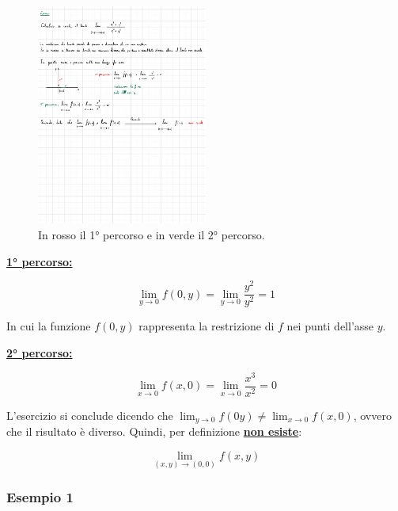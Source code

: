 \documentclass[a4paper]{article}
\begin{document}
	\begin{figure}[!htp]
		\centering
		\includegraphics[width=0.5\textwidth]{img/limiti.pdf}
		\caption{In rosso il 1° percorso e in verde il 2° percorso.}
	\end{figure}
	
	\noindent
	\textcolor{Red3}{\textbf{\underline{1° percorso:}}}
	
	\begin{equation*}
		\lim_{y \rightarrow 0} f\left(0,y\right) = \lim_{y \rightarrow 0} \dfrac{y^{2}}{y^{2}} = 1
	\end{equation*}

	\noindent
	In cui la funzione $f\left(0,y\right)$ rappresenta la restrizione di $f$ nei punti dell'asse $y$.\newline
	
	\noindent
	\textcolor{Green4}{\textbf{\underline{2° percorso:}}}
	
	\begin{equation*}
		\lim_{x \rightarrow 0} f\left(x,0\right) = \lim_{x \rightarrow 0} \dfrac{x^{3}}{x^{2}} = 0
	\end{equation*}
	
	\noindent
	L'esercizio si conclude dicendo che $\lim_{y \rightarrow 0}f\left(0y\right) \ne \lim_{x \rightarrow 0}f\left(x,0\right)$, ovvero che il risultato è diverso. Quindi, per definizione \textbf{\underline{non esiste}}:
	
	\begin{equation*}
		\lim_{\left(x,y\right) \rightarrow \left(0,0\right)} f\left(x,y\right)
	\end{equation*}

	\newpage

	\subsubsection[Esempio 1]{\textcolor{Green4}{Esempio 1}}
	
\end{document}
